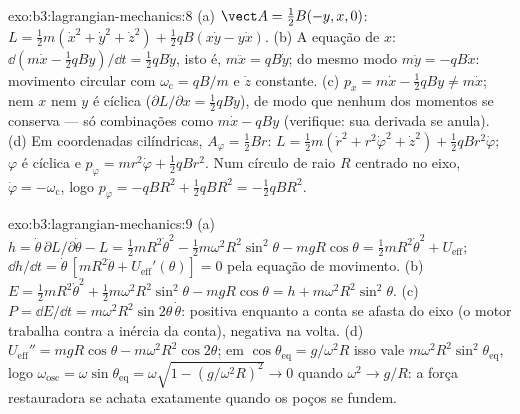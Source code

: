 \begin{solution}{exo:b3:lagrangian-mechanics:8}
(a) $\vect A = \tfrac12 B(-y, x, 0)$:
$L = \tfrac12 m(\dot x^2 + \dot y^2 + \dot z^2) + \tfrac12 qB(x\dot y -
y\dot x)$. (b) A equação de $x$: $\dd(m\dot x - \tfrac12 qBy)/\dd t =
\tfrac12 qB\dot y$, isto é, $m\ddot x = qB\dot y$; do mesmo modo $m\ddot y =
-qB\dot x$: movimento circular com $\omega_{\text{c}} = qB/m$ e $\dot z$
constante. (c) $p_x = m\dot x - \tfrac12 qBy \neq m\dot x$; nem $x$
nem $y$ é cíclica ($\partial L/\partial x = \tfrac12 qB\dot y$), de
modo que nenhum dos momentos se conserva --- só combinações como $m\dot x -
qBy$ (verifique: sua derivada se anula). (d) Em coordenadas
cilíndricas, $A_\varphi = \tfrac12 Br$:
$L = \tfrac12 m(\dot r^2 + r^2\dot\varphi^2 + \dot z^2) + \tfrac12
qBr^2\dot\varphi$; $\varphi$ é cíclica e $p_\varphi = mr^2\dot\varphi +
\tfrac12 qBr^2$. Num círculo de raio $R$ centrado no eixo,
$\dot\varphi = -\omega_{\text{c}}$, logo $p_\varphi = -qBR^2 + \tfrac12
qBR^2 = -\tfrac12 qBR^2$.
\end{solution}

\begin{solution}{exo:b3:lagrangian-mechanics:9}
(a) $h = \dot\theta\,\partial L/\partial\dot\theta - L = \tfrac12
mR^2\dot\theta^2 - \tfrac12 m\omega^2R^2\sin^2\theta - mgR\cos\theta =
\tfrac12 mR^2\dot\theta^2 + U_{\text{eff}}$; $\dd h/\dd t =
\dot\theta\,[mR^2\ddot\theta + U_{\text{eff}}'(\theta)] = 0$ pela
equação de movimento. (b) $E = \tfrac12 mR^2\dot\theta^2 + \tfrac12
m\omega^2R^2\sin^2\theta - mgR\cos\theta = h +
m\omega^2R^2\sin^2\theta$. (c) $P = \dd E/\dd t =
m\omega^2R^2\sin2\theta\,\dot\theta$: positiva enquanto a conta se
afasta do eixo (o motor trabalha contra a inércia da conta), negativa
na volta. (d) $U_{\text{eff}}'' = mgR\cos\theta -
m\omega^2R^2\cos2\theta$; em $\cos\theta_{\text{eq}} = g/\omega^2R$
isso vale $m\omega^2R^2\sin^2\theta_{\text{eq}}$, logo
$\omega_{\text{osc}} = \omega\sin\theta_{\text{eq}} = \omega\sqrt{1 -
(g/\omega^2R)^2} \to 0$ quando $\omega^2 \to g/R$: a força restauradora
se achata exatamente quando os poços se fundem.
\end{solution}

